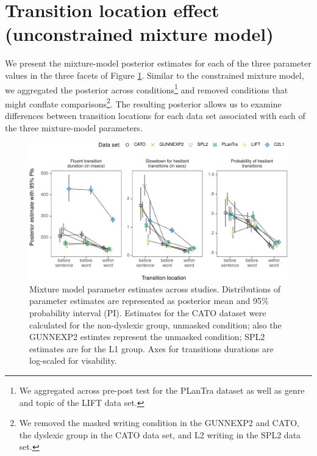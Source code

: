 \documentclass[
  man,floatsintext]{apa7}
\begin{document}
\newpage

\hypertarget{transition-location-effect-unconstrained-mixture-model}{%
\section{Transition location effect (unconstrained mixture model)}\label{transition-location-effect-unconstrained-mixture-model}}

We present the mixture-model posterior estimates for each of the three parameter values in the three facets of Figure \ref{fig:crossstudypost}. Similar to the constrained mixture model, we aggregated the posterior across conditions\footnote{We aggregated across pre-post test for the PLanTra dataset as well as genre and topic of the LIFT data set.} and removed conditions that might conflate comparisons\footnote{We removed the masked writing condition in the GUNNEXP2 and CATO, the dyslexic group in the CATO data set, and L2 writing in the SPL2 data set.}. The resulting posterior allows us to examine differences between transition locations for each data set associated with each of the three mixture-model parameters.

\begin{figure}

{\centering \includegraphics{manuscript_files/figure-latex/crossstudypost-1} 

}

\caption{Mixture model parameter estimates across studies. Distributions of parameter estimates are represented as posterior mean and 95\% probability interval (PI). Estimates for the CATO dataset were calculated for the non-dyslexic group, unmasked condition; also the GUNNEXP2 estimtes represent the unmasked condition; SPL2 estimates are for the L1 group. Axes for transitions durations are log-scaled for visability.}\label{fig:crossstudypost}
\end{figure}
\end{document}
